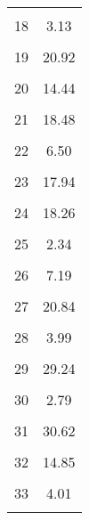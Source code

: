 \begin{table}[H]
\begin{tabular}{l*{1}{c}}
                    &            \\
[1em]
18                  &        3.13\\
                    &            \\
[1em]
19                  &       20.92\\
                    &            \\
[1em]
20                  &       14.44\\
                    &            \\
[1em]
21                  &       18.48\\
                    &            \\
[1em]
22                  &        6.50\\
                    &            \\
[1em]
23                  &       17.94\\
                    &            \\
[1em]
24                  &       18.26\\
                    &            \\
[1em]
25                  &        2.34\\
                    &            \\
[1em]
26                  &        7.19\\
                    &            \\
[1em]
27                  &       20.84\\
                    &            \\
[1em]
28                  &        3.99\\
                    &            \\
[1em]
29                  &       29.24\\
                    &            \\
[1em]
30                  &        2.79\\
                    &            \\
[1em]
31                  &       30.62\\
                    &            \\
[1em]
32                  &       14.85\\
                    &            \\
[1em]
33                  &        4.01\\
                    &            \\

\end{tabular}
\end{table}
